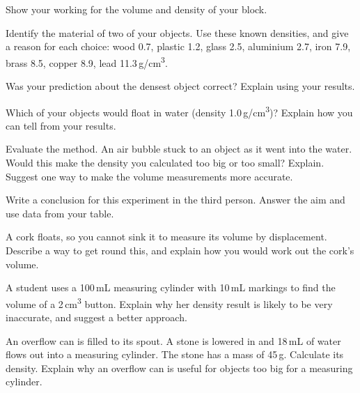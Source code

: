 \task Show your working for the volume and density of your block. 
\workbox{4cm}


\task Identify the material of two of your objects. Use these known densities, and give a reason for each choice: wood 0.7, plastic 1.2, glass 2.5, aluminium 2.7, iron 7.9, brass 8.5, copper 8.9, lead 11.3\,g/cm\textsuperscript{3}. 
\answerbox{5cm}

\task Was your prediction about the densest object correct? Explain using your results. 
\answerbox{5cm}

\task Which of your objects would float in water (density 1.0\,g/cm\textsuperscript{3})? Explain how you can tell from your results.
\answerbox{5cm}

\task Evaluate the method. 
An air bubble stuck to an object as it went into the water. Would this make the density you calculated too big or too small? Explain.
\answerbox{5cm}
Suggest one way to make the volume measurements more accurate.
\answerbox{5cm}

\task Write a conclusion for this experiment in the third person. Answer the aim and use data from your table. 

\answerbox{5.5cm}

\begin{yr8box}
\begin{keepext}
\exttask A cork floats, so you cannot sink it to measure its volume by displacement. Describe a way to get round this, and explain how you would work out the cork's volume.
\answerbox{5cm}
\end{keepext}
\begin{keepext}
\exttask A student uses a 100\,mL measuring cylinder with 10\,mL markings to find the volume of a 2\,cm\textsuperscript{3} button. Explain why her density result is likely to be very inaccurate, and suggest a better approach.
\answerbox{5cm}
\end{keepext}
\begin{keepext}
\exttask An overflow can is filled to its spout. A stone is lowered in and 18\,mL of water flows out into a measuring cylinder. The stone has a mass of 45\,g.
Calculate its density.
\workbox{3cm}
Explain why an overflow can is useful for objects too big for a measuring cylinder.
\answerbox{5cm}
\end{keepext}
\end{yr8box}

